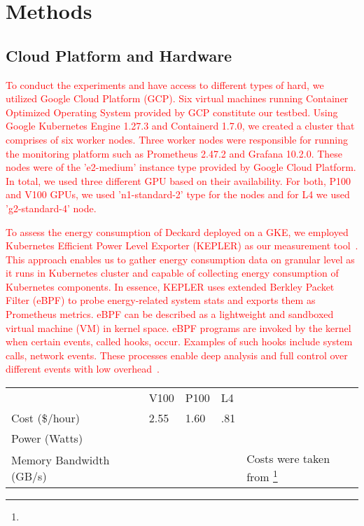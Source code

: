 \documentclass[conference]{IEEEtran}
\begin{document}


\section{Methods}
\subsection{Cloud Platform and Hardware}
\textcolor{red}{To conduct the experiments and have access to different types of hard, we utilized Google Cloud Platform (GCP). Six virtual machines running Container Optimized Operating System provided by GCP constitute our testbed. Using Google Kubernetes Engine 1.27.3 and Containerd 1.7.0,  we created a cluster that comprises of six worker nodes. Three worker nodes were responsible for running the monitoring platform such as Prometheus 2.47.2 and Grafana 10.2.0. These nodes were of the 'e2-medium' instance type provided by Google Cloud Platform. In total, we used three different GPU based on their availability. For both, P100 and V100 GPUs, we used 'n1-standard-2' type for the nodes and for L4  we used 'g2-standard-4' node.}

\textcolor{red}{To assess the energy consumption of Deckard deployed on a GKE, we employed Kubernetes Efficient Power Level Exporter (KEPLER) as our measurement tool~\cite{amaral2023kepler}. This approach enables us to gather energy consumption data on granular level as it runs in Kubernetes cluster and capable of collecting energy consumption of Kubernetes components. In essence, KEPLER uses extended Berkley Packet Filter (eBPF) to probe energy-related system stats and exports them as Prometheus metrics. eBPF can be described as a lightweight and sandboxed virtual machine (VM) in kernel space. eBPF programs are invoked by the kernel when certain events, called hooks, occur. Examples of such hooks include system calls, network events. These processes enable deep analysis and full control over different events with low overhead~\cite{sedghpour@ebpf}.}
\begin{table}[]
\begin{tabular}{lllll}
                 & V100   & P100   & L4    &  \\
Cost (\$/hour)    & 2.55 & 1.60 & .81 &  \\
Power (Watts)           &        &        &       &  \\
Memory Bandwidth (GB/s) &        &        &       & 

Costs were taken from \footnote{}
\label{tab:hardware}
\end{tabular}
\end{table}
\end{document}
